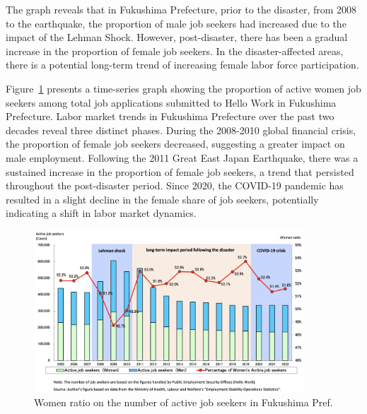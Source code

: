 \documentclass[12pt,halfline,a4paper]{ouparticle}
\begin{document}
The graph reveals that in Fukushima Prefecture, prior to the disaster, from 2008 to the earthquake, the proportion of male job seekers had increased due to the impact of the Lehman Shock. However, post-disaster, there has been a gradual increase in the proportion of female job seekers. In the disaster-affected areas, there is a potential long-term trend of increasing female labor force participation.

Figure~\ref{fig:women_ratio_fukushima} presents a time-series graph showing the proportion of active women job seekers among total job applications submitted to Hello Work in Fukushima Prefecture. Labor market trends in Fukushima Prefecture over the past two decades reveal three distinct phases. During the 2008-2010 global financial crisis, the proportion of female job seekers decreased, suggesting a greater impact on male employment. Following the 2011 Great East Japan Earthquake, there was a sustained increase in the proportion of female job seekers, a trend that persisted throughout the post-disaster period. Since 2020, the COVID-19 pandemic has resulted in a slight decline in the female share of job seekers, potentially indicating a shift in labor market dynamics.

\begin{figure}[h!]
    \centering
    \includegraphics[width=0.9\textwidth]{Women ratio on the number of active job seekers2}  %
    \caption{Women ratio on the number of active job seekers in Fukushima Pref.}
    \label{fig:women_ratio_fukushima}
\end{figure}


\newpage
\end{document}
